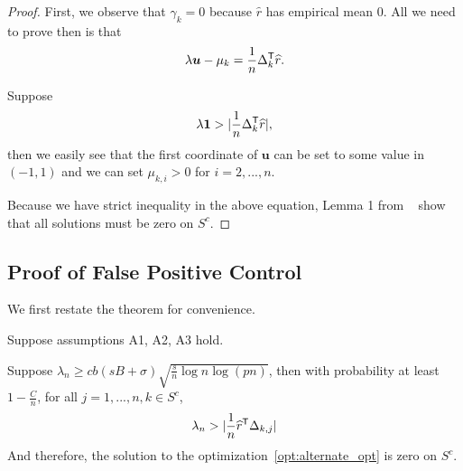 \begin{proof}
First, we observe that $\gamma_k = 0$ because $\hat{r}$ has empirical mean 0. All we need to prove then is that 
\[
\lambda \mbox{\boldmath $u$} - \mu_k = \frac{1}{n} \Delta_k^{\mathsf{T}} \widehat{r}.
\]

Suppose
\[
\lambda \mbox{\boldmath $1$} > |\frac{1}{n} \Delta_k^{\mathsf{T}}\widehat{r}|,
\]
then we easily see that the first coordinate of $\mathbf{u}$ can be set to some value in $(-1,1)$ and we can set $\mu_{k,i} > 0$ for $i=2,...,n$. 

Because we have strict inequality in the above equation, Lemma 1 from ~\cite{Wain:09a} show that all solutions must be zero on $S^c$.
\end{proof}
 
 
 
 
 
 
 \subsection{Proof of False Positive Control}
 \label{sec:false_positive_proof}
 
 We first restate the theorem for convenience.
 
 
\begin{theorem} 
Suppose assumptions A1, A2, A3 hold. 

Suppose $\lambda_n \geq c b (sB + \sigma) \sqrt{ \frac{s}{n} \log n \log (pn)}$, then with probability at least $ 1 - \frac{C}{n}$, for all $j=1,...,n,k \in S^c$,
\[
\lambda_n >  | \frac{1}{n} \widehat{r}^{\mathsf{T}} \Delta_{k,j}|
\]
And therefore, the solution to the optimization~\ref{opt:alternate_opt} is zero on $S^c$.
\end{theorem}

